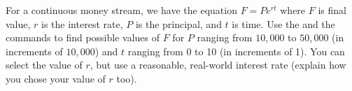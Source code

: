 {For a continuous money stream, we have the equation $F=P e^{rt}$ where $F$ is final value, $r$ is the interest rate, $P$ is the principal, and $t$ is time.  Use the  and the  commands to find possible values of $F$ for $P$ ranging from $10,000$ to $50,000$ (in increments of $10,000$) and $t$ ranging from 0 to 10 (in increments of 1).  You can select the value of $r$, but use a reasonable, real-world interest rate (explain how you chose your value of $r$ too).}
{}
